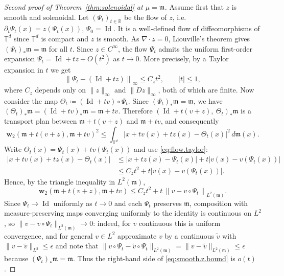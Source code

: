 \documentclass[11pt,reqno]{amsart}
\theoremstyle{plain}
\theoremstyle{definition}
\newcommand{\dw}{\mathbf{w}_2}
\newcommand{\T}{\mathbb{T}}
\newcommand{\R}{\mathbb{R}}
\newcommand{\Leb}{\mathfrak{m}}
\DeclareMathOperator{\Id}{Id}
\begin{document}
\begin{proof}[Second proof of Theorem~\ref{thm:solenoidal} at \(\mu=\Leb\)]
    Assume first that \( z \) is smooth and solenoidal.
    Let \( (\Psi_t)_{t\in\R} \) be the flow of \( z \), i.e. \( \partial_t\Psi_t(x)=z(\Psi_t(x)) \), \( \Psi_0=\Id \).
    It is a well-defined flow of diffeomorphisms of \( \T^d \) since \( \T^d \) is compact and \( z \) is smooth.
    As \( \nabla\cdot z=0 \), Liouville's theorem gives \( (\Psi_t)_\ast \Leb=\Leb \) for all
    \( t \).
    Since \(z\in C^\infty\), the flow \(\Psi_t\) admits the uniform first-order expansion \(\Psi_t=\Id+tz+O(t^2)\) as \(t\to0\).
    More precisely, by a Taylor expansion in \( t \) we get
    \begin{equation}\label{eq:flow.taylor}
        \left\lVert \Psi_t-(\Id+tz) \right\rVert_\infty\le C_zt^2 ,\qquad \lvert t \rvert\le1,
    \end{equation}
    where \(C_z\) depends only on \(\lVert z \rVert_\infty\) and \(\lVert Dz \rVert_\infty\), both of which are finite.
    Now consider the map \( \Theta_t\coloneqq (\Id+tv)\circ\Psi_t \).
    Since \( (\Psi_t)_\ast \Leb=\Leb \), we have \( (\Theta_t)_\ast \Leb=(\Id+tv)_\ast \Leb=\Leb+tv \).
    Therefore \( \left(\Id+t(v+z),\ \Theta_t\right)_\ast \Leb \) is a transport plan between \( \Leb+t(v+z) \) and \( \Leb+tv \), and consequently
    \[
        \dw\left(\Leb+t(v+z),\Leb+tv\right)^2
        \le\int_{\T^d}\big\lvert x+t v(x)+tz(x)-\Theta_t(x)\big \rvert^2\,d\Leb(x).
    \]
    Write \( \Theta_t(x)=\Psi_t(x)+tv(\Psi_t(x)) \) and use \eqref{eq:flow.taylor}:
    \[
        \begin{split}
            \big\lvert x+tv(x)+tz(x)-\Theta_t(x)\big \rvert
             & \le\big\lvert x+tz(x)-\Psi_t(x)\big \rvert+t\big\lvert v(x)-v(\Psi_t(x))\big \rvert \\
             & \le C_zt^2+t\big\lvert v(x)-v(\Psi_t(x))\big \rvert .
        \end{split}
    \]
    Hence, by the triangle inequality in \( L^2(\Leb) \),
    \begin{equation}\label{eq:smooth.z.bound}
        \dw\left(\Leb+t(v+z),\Leb+tv\right)
        \le C_zt^2+t\,\left\lVert v-v\circ\Psi_t \right\rVert_{L^2(\Leb)} .
    \end{equation}
    Since \( \Psi_t\to\Id \) uniformly as \( t\to0 \) and each \( \Psi_t \) preserves \( \Leb \), composition with measure-preserving maps converging uniformly to the identity is continuous on \(L^2\), so \( \lVert v-v\circ\Psi_t \rVert_{L^2(\Leb)}\to0 \): indeed, for \( v \) continuous this is uniform convergence, and for general \( v\in L^2 \) approximate \( v \) by a continuous \( \tilde v \) with \( \lVert v-\tilde v \rVert_{L^2}\le\epsilon \) and note that \(\lVert v\circ\Psi_t-\tilde v\circ\Psi_t \rVert_{L^2(\Leb)}=\lVert v-\tilde v \rVert_{L^2(\Leb)} \le\epsilon\) because \( (\Psi_t)_\ast \Leb=\Leb \).
    Thus the right-hand side of \eqref{eq:smooth.z.bound} is \( o(t) \).


\end{proof}
\end{document}
